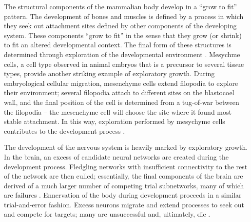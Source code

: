 The structural components of the mammalian body develop in a ``grow to fit'' pattern. The development of bones and muscles is defined by a process in which they seek out attachment sites defined by other components of the developing system. These components ``grow to fit'' in the sense that they grow (or shrink) to fit an altered developmental context. The final form of these structures is determined through exploration of the developmental environment \cite[pg 214]{Downing2015IntelligenceSystems}. Mesychme cells, a cell type observed in animal embryos that is a precursor to several tissue types, provide another striking example of exploratory growth. During embryological cellular migration, mesenchyme cells extend filopodia to explore their environment; several filopodia attach to different sites on the blastocoel wall, and the final position of the cell is determined from a tug-of-war between the filopodia -- the mesenchyme cell will choose the site where it found most stable attachment. In this way, exploration performed by mesychyme cells contributes to the development process \cite[pg 214]{Downing2015IntelligenceSystems}.

The development of the nervous system is heavily marked by exploratory growth. In the brain, an excess of candidate neural networks are created during the development process. Fledgling networks with insufficient connectivity to the rest of the network are then culled; essentially, the final components of the brain are derived of a much larger number of competing trial subnetworks, many of which are failures \cite[p 214]{Downing2015IntelligenceSystems}. Ennervation of the body during development proceeds in a similar trial-and-error fashion. Excess neurons migrate and extend processes to seek out and compete for targets; many are unsuccessful and, ultimately, die \cite{Edelman2001DegeneracySystems}. 

